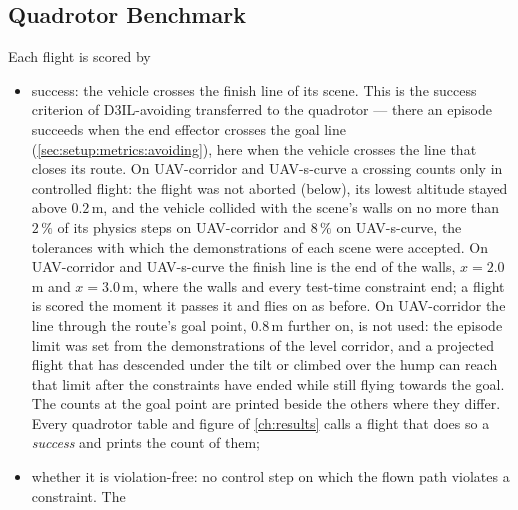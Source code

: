 \subsection{Quadrotor Benchmark}\label{sec:setup:metrics:uav}

Each flight is scored by
\begin{itemize}
  \item success: the vehicle crosses the finish line of its scene. This is the success
    criterion of D3IL-avoiding transferred to the quadrotor --- there an episode succeeds when the end effector
    crosses the goal line (\autoref{sec:setup:metrics:avoiding}), here when the vehicle crosses the line
    that closes its route. On UAV-corridor and UAV-s-curve a crossing counts only in controlled flight: the
    flight was not aborted (below), its lowest altitude stayed above $0.2$\,m, and the vehicle collided with
    the scene's walls on no more than $2\,\%$ of its physics steps on UAV-corridor and $8\,\%$ on
    UAV-s-curve, the tolerances with which the demonstrations of each scene were accepted. On UAV-corridor
    and UAV-s-curve the finish line is the end of the walls, $x=2.0$\,m and $x=3.0$\,m, where the walls and
    every test-time constraint end; a flight is scored the moment it passes it and flies on as before. On
    UAV-corridor the line through the route's goal point, $0.8$\,m further on, is not used: the episode limit was set from the
    demonstrations of the level corridor, and a projected flight that has descended under the tilt or climbed
    over the hump can reach that limit after the constraints have ended while still flying towards the goal.
    The counts at the goal point are printed beside the others where they differ. Every quadrotor
    table and figure of \autoref{ch:results} calls a flight that does so a \emph{success} and prints the
    count of them;
  \item whether it is violation-free: no control step on which the flown path violates a constraint. The

\end{itemize}
